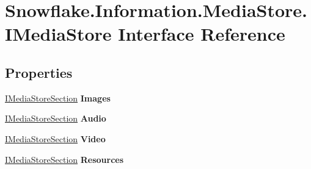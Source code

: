 \hypertarget{interface_snowflake_1_1_information_1_1_media_store_1_1_i_media_store}{}\section{Snowflake.\+Information.\+Media\+Store.\+I\+Media\+Store Interface Reference}
\label{interface_snowflake_1_1_information_1_1_media_store_1_1_i_media_store}
\subsection*{Properties}
\begin{DoxyCompactItemize}
\item 
\hypertarget{interface_snowflake_1_1_information_1_1_media_store_1_1_i_media_store_a3925774cc1ddc8c2171398ca21638569}{}\hyperlink{interface_snowflake_1_1_information_1_1_media_store_1_1_i_media_store_section}{I\+Media\+Store\+Section} {\bfseries Images}\label{interface_snowflake_1_1_information_1_1_media_store_1_1_i_media_store_a3925774cc1ddc8c2171398ca21638569}

\item 
\hypertarget{interface_snowflake_1_1_information_1_1_media_store_1_1_i_media_store_a283752cbb2839696fe291e4976b435ed}{}\hyperlink{interface_snowflake_1_1_information_1_1_media_store_1_1_i_media_store_section}{I\+Media\+Store\+Section} {\bfseries Audio}\label{interface_snowflake_1_1_information_1_1_media_store_1_1_i_media_store_a283752cbb2839696fe291e4976b435ed}

\item 
\hypertarget{interface_snowflake_1_1_information_1_1_media_store_1_1_i_media_store_a0d8d5f35916dad519af29f96c5015225}{}\hyperlink{interface_snowflake_1_1_information_1_1_media_store_1_1_i_media_store_section}{I\+Media\+Store\+Section} {\bfseries Video}\label{interface_snowflake_1_1_information_1_1_media_store_1_1_i_media_store_a0d8d5f35916dad519af29f96c5015225}

\item 
\hypertarget{interface_snowflake_1_1_information_1_1_media_store_1_1_i_media_store_a68360d177681f9ba57362e334f71543d}{}\hyperlink{interface_snowflake_1_1_information_1_1_media_store_1_1_i_media_store_section}{I\+Media\+Store\+Section} {\bfseries Resources}\label{interface_snowflake_1_1_information_1_1_media_store_1_1_i_media_store_a68360d177681f9ba57362e334f71543d}


\end{DoxyCompactItemize}

